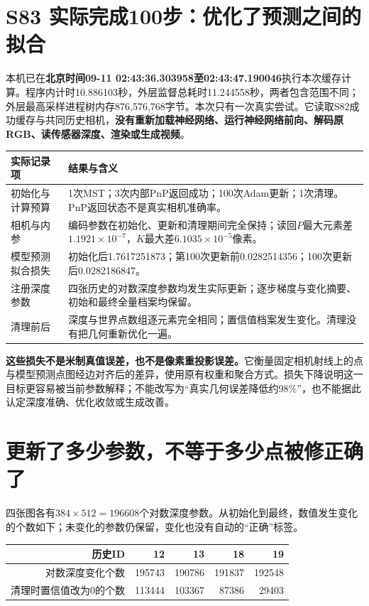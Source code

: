 \section{ S83 实际完成100步：优化了预测之间的拟合}
本机已在\textbf{北京时间09-11 02:43:36.303958至02:43:47.190046}执行本次缓存计算。程序内计时10.886103秒，外层监督总耗时11.244558秒，两者包含范围不同；外层最高采样进程树内存876,576,768字节。本次只有一次真实尝试。它读取S82成功缓存与共同历史相机，\textbf{没有重新加载神经网络、运行神经网络前向、解码原RGB、读传感器深度、渲染或生成视频}。

\begin{center}\small
\begin{tabular}{p{4.1cm}p{10.8cm}}\toprule
实际记录项&结果与含义\\\midrule
初始化与计算预算&1次MST；3次内部PnP返回成功；100次Adam更新；1次清理。PnP返回状态不是真实相机准确率。\\
相机与内参&编码参数在初始化、更新和清理期间完全保持；读回$P$最大元素差$1.1921\times10^{-7}$，$K$最大差$6.1035\times10^{-5}$像素。\\
模型预测拟合损失&初始化后1.7617251873；第100次更新前0.0282514356；100次更新后0.0282186847。\\
注册深度参数&四张历史的对数深度参数均发生实际更新；逐步梯度与变化摘要、初始和最终全量档案均保留。\\
清理前后&深度与世界点数组逐元素完全相同；置信值档案发生变化。清理没有把几何重新优化一遍。\\\bottomrule
\end{tabular}\end{center}

\noindent\textbf{这些损失不是米制真值误差，也不是像素重投影误差。}它衡量固定相机射线上的点与模型预测点图经边对齐后的差异，使用原有权重和聚合方式。损失下降说明这一目标更容易被当前参数解释；不能改写为“真实几何误差降低约98\%”，也不能据此认定深度准确、优化收敛或生成改善。

\section{ 更新了多少参数，不等于多少点被修正确了}
四张图各有$384\times512=196608$个对数深度参数。从初始化到最终，数值发生变化的个数如下；未变化的参数仍保留，变化也没有自动的“正确”标签。

\begin{center}
\begin{tabular}{rrrrr}\toprule
历史ID&12&13&18&19\\\midrule
对数深度变化个数&195743&190786&191837&192548\\
清理时置信值改为0的个数&113444&103367&87386&29403\\\bottomrule
\end{tabular}\end{center}

